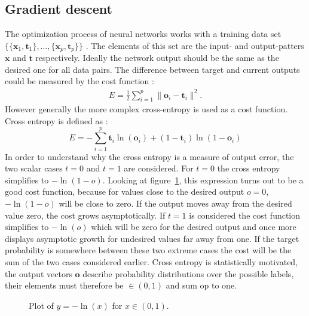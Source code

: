 \subsection{Gradient descent}
The optimization process of neural networks works with a training data set $\{\{\mathbf{x}_1,\mathbf{t}_1\}, \dots , \{\mathbf{x}_p,\mathbf{t}_p\} \}$ \cite[page 156]{Rojas1996}. The elements of this set are the input- and output-patters $\mathbf{x}$ and $\mathbf{t}$ respectively. Ideally the network output should be the same as the desired one for all data pairs. The difference between target and current outputs could be measured by the cost function \cite[page 156]{Rojas1996}:
\begin{align}
E = \frac{1}{2}\sum\limits_{i=1}^{p} \| \mathbf{o}_i - \mathbf{t}_i \|^2.
\end{align}
However generally the more complex cross-entropy is used as a cost function. Cross entropy is defined as \cite[page 245]{Bishop1995}:
\begin{equation}
E = - \sum\limits_{i=1}^{p} {\mathbf{t}_i \ln(\mathbf{o}_i)} + (1 - \mathbf{t}_i)\ln(1 - \mathbf{o}_i)
\label{eq:corssEntropy}
\end{equation}
In order to understand why the cross entropy is a measure of output error, the two scalar cases $t=0$ and $t=1$ are considered. For $t = 0$ the cross entropy simplifies to $-\ln(1 - o)$. Looking at figure~\ref{fig:logPlot}, this expression turns out to be a good cost function, because for values close to the desired output $o = 0$, $-\ln(1 - o)$ will be close to zero. If the output moves away from the desired value zero, the cost grows asymptotically. If $t = 1$ is considered the cost function simplifies to $-\ln(o)$ which will be zero for the desired output and once more displays asymptotic growth for undesired values far away from one. If the target probability is somewhere between these two extreme cases the cost will be the sum of the two cases considered earlier. Cross entropy is statistically motivated, the output vectors $\mathbf{o}$ describe probability distributions over the possible labels, their elements must therefore be $\in (0,1)$ and sum op to one.  
\begin{figure}
\centering

\caption{Plot of $y = -\ln(x)$ for $x \in (0,1)$.}
\label{fig:logPlot}
\end{figure}

